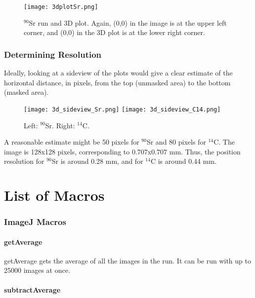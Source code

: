 \documentclass[a4paper,10pt]{article}
\begin{document}
\begin{figure}[!htbp]
	\centering
	\texttt{[image: 3dplotSr.png]}
	\caption{$^{90}$Sr run and 3D plot. Again, (0,0) in the image is at the upper left corner, and (0,0) in the 3D plot is at the lower right corner.}
	\label{fig:3dplotSr}
\end{figure}

\section{Determining Resolution}

Ideally, looking at a sideview of the plots would give a clear estimate of the horizontal distance, in pixels, from the top (unmasked area) to the bottom (masked area). 

\begin{figure}[!htbp]
	\centering
	\texttt{[image: 3d\_sideview\_Sr.png]}
	\hspace{0.1in}
	\texttt{[image: 3d\_sideview\_C14.png]}
	\caption{Left: $^{90}$Sr. Right: $^{14}$C.}
	\label{fig:sideviews}
\end{figure}

A reasonable estimate might be 50 pixels for $^{90}$Sr and 80 pixels for $^{14}$C. The image is 128x128 pixels, corresponding to 0.707x0.707 mm. Thus, the position resolution for $^{90}$Sr is around 0.28 mm, and for $^{14}$C is around 0.44 mm.


\part{List of Macros}
\section{ImageJ Macros}

\subsection{getAverage}

getAverage gets the average of all the images in the run. It can be run with up to 25000 images at once. 

\subsection{subtractAverage}
\end{document}
